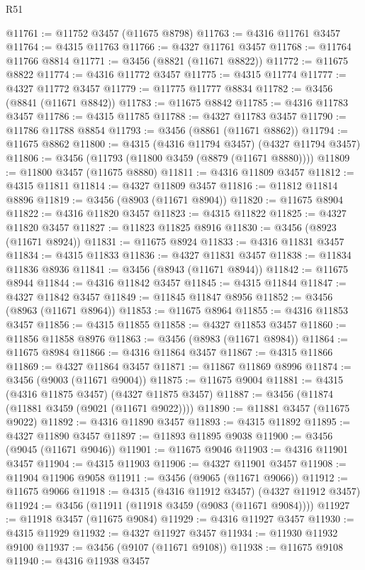 \begin{lexlean}{R51}
\begin{coremodule}
@11761 := @11752 @3457 (@11675 @8798)
@11763 := @4316 @11761 @3457
@11764 := @4315 @11763
@11766 := @4327 @11761 @3457
@11768 := @11764 @11766 @8814
@11771 := @3456 (@8821 (@11671 @8822))
@11772 := @11675 @8822
@11774 := @4316 @11772 @3457
@11775 := @4315 @11774
@11777 := @4327 @11772 @3457
@11779 := @11775 @11777 @8834
@11782 := @3456 (@8841 (@11671 @8842))
@11783 := @11675 @8842
@11785 := @4316 @11783 @3457
@11786 := @4315 @11785
@11788 := @4327 @11783 @3457
@11790 := @11786 @11788 @8854
@11793 := @3456 (@8861 (@11671 @8862))
@11794 := @11675 @8862
@11800 := @4315 (@4316 @11794 @3457) (@4327 @11794 @3457)
@11806 := @3456 (@11793 (@11800 @3459 (@8879 (@11671 @8880))))
@11809 := @11800 @3457 (@11675 @8880)
@11811 := @4316 @11809 @3457
@11812 := @4315 @11811
@11814 := @4327 @11809 @3457
@11816 := @11812 @11814 @8896
@11819 := @3456 (@8903 (@11671 @8904))
@11820 := @11675 @8904
@11822 := @4316 @11820 @3457
@11823 := @4315 @11822
@11825 := @4327 @11820 @3457
@11827 := @11823 @11825 @8916
@11830 := @3456 (@8923 (@11671 @8924))
@11831 := @11675 @8924
@11833 := @4316 @11831 @3457
@11834 := @4315 @11833
@11836 := @4327 @11831 @3457
@11838 := @11834 @11836 @8936
@11841 := @3456 (@8943 (@11671 @8944))
@11842 := @11675 @8944
@11844 := @4316 @11842 @3457
@11845 := @4315 @11844
@11847 := @4327 @11842 @3457
@11849 := @11845 @11847 @8956
@11852 := @3456 (@8963 (@11671 @8964))
@11853 := @11675 @8964
@11855 := @4316 @11853 @3457
@11856 := @4315 @11855
@11858 := @4327 @11853 @3457
@11860 := @11856 @11858 @8976
@11863 := @3456 (@8983 (@11671 @8984))
@11864 := @11675 @8984
@11866 := @4316 @11864 @3457
@11867 := @4315 @11866
@11869 := @4327 @11864 @3457
@11871 := @11867 @11869 @8996
@11874 := @3456 (@9003 (@11671 @9004))
@11875 := @11675 @9004
@11881 := @4315 (@4316 @11875 @3457) (@4327 @11875 @3457)
@11887 := @3456 (@11874 (@11881 @3459 (@9021 (@11671 @9022))))
@11890 := @11881 @3457 (@11675 @9022)
@11892 := @4316 @11890 @3457
@11893 := @4315 @11892
@11895 := @4327 @11890 @3457
@11897 := @11893 @11895 @9038
@11900 := @3456 (@9045 (@11671 @9046))
@11901 := @11675 @9046
@11903 := @4316 @11901 @3457
@11904 := @4315 @11903
@11906 := @4327 @11901 @3457
@11908 := @11904 @11906 @9058
@11911 := @3456 (@9065 (@11671 @9066))
@11912 := @11675 @9066
@11918 := @4315 (@4316 @11912 @3457) (@4327 @11912 @3457)
@11924 := @3456 (@11911 (@11918 @3459 (@9083 (@11671 @9084))))
@11927 := @11918 @3457 (@11675 @9084)
@11929 := @4316 @11927 @3457
@11930 := @4315 @11929
@11932 := @4327 @11927 @3457
@11934 := @11930 @11932 @9100
@11937 := @3456 (@9107 (@11671 @9108))
@11938 := @11675 @9108
@11940 := @4316 @11938 @3457

\end{coremodule}
\end{lexlean}
